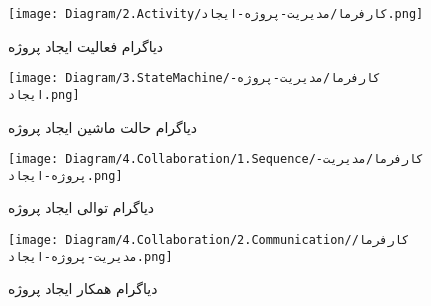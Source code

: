 \begin{figure}[H]
	\centering
	\texttt{[image: Diagram/2.Activity/کارفرما/مدیریت-پروژه-ایجاد.png]}
	\caption{دیاگرام فعالیت ایجاد پروژه}
	\label{fig:a:ایجاد-پروژه}
\end{figure}
\begin{figure}[H]
\centering
\texttt{[image: Diagram/3.StateMachine/کارفرما/مدیریت-پروژه-ایجاد.png]}
\caption{دیاگرام حالت ماشین ایجاد پروژه}
\label{fig:sm:ایجاد-پروژه}
\end{figure}
\begin{figure}[H]
	\centering
	\texttt{[image: Diagram/4.Collaboration/1.Sequence/کارفرما/مدیریت-پروژه-ایجاد.png]}
	\caption{دیاگرام توالی ایجاد پروژه}
	\label{fig:s:ایجاد-پروژه}
\end{figure}
\begin{figure}[H]
\centering
\texttt{[image: Diagram/4.Collaboration/2.Communication/کارفرما/مدیریت-پروژه-ایجاد.png]}
\caption{دیاگرام همکار ایجاد پروژه}
\label{fig:c:ایجاد-پروژه}
\end{figure}
